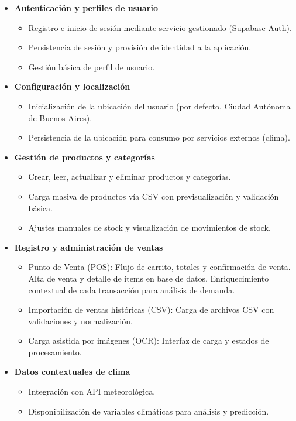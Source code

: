 \begin{itemize}
    \item \textbf{Autenticación y perfiles de usuario}
    \begin{itemize}
        \item Registro e inicio de sesión mediante servicio gestionado (Supabase Auth).
        \item Persistencia de sesión y provisión de identidad a la aplicación.
        \item Gestión básica de perfil de usuario.
    \end{itemize}

    \item \textbf{Configuración y localización}
    \begin{itemize}
        \item Inicialización de la ubicación del usuario (por defecto, Ciudad Autónoma de Buenos Aires).
        \item Persistencia de la ubicación para consumo por servicios externos (clima).
    \end{itemize}

    \item \textbf{Gestión de productos y categorías}
    \begin{itemize}
        \item Crear, leer, actualizar y eliminar productos y categorías.
        \item Carga masiva de productos vía CSV con previsualización y validación básica.
        \item Ajustes manuales de stock y visualización de movimientos de stock.
    \end{itemize}

    \item \textbf{Registro y administración de ventas}
    \begin{itemize}
        \item Punto de Venta (POS): Flujo de carrito, totales y confirmación de venta. Alta de venta y detalle de ítems en base de datos. Enriquecimiento contextual de cada transacción para análisis de demanda.
        \item Importación de ventas históricas (CSV): Carga de archivos CSV con validaciones y normalización.
        \item Carga asistida por imágenes (OCR): Interfaz de carga y estados de procesamiento.
    \end{itemize}

    \item \textbf{Datos contextuales de clima}
    \begin{itemize}
        \item Integración con API meteorológica.
        \item Disponibilización de variables climáticas para análisis y predicción.
    \end{itemize}


\end{itemize}
